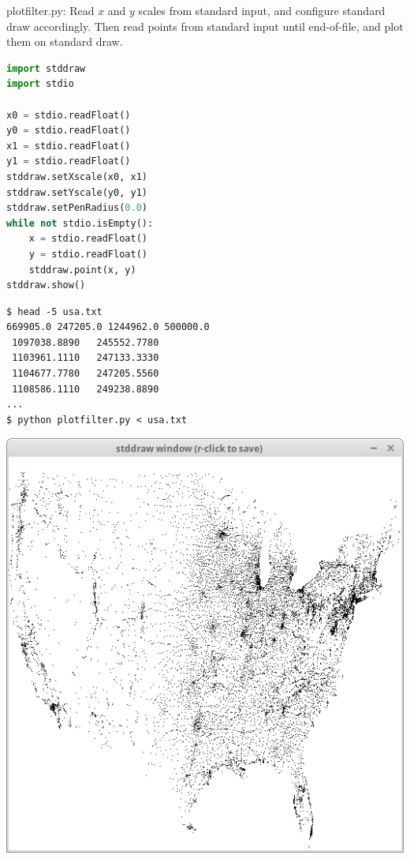 \documentclass[8pt,a4paper,compress,handout]{beamer}
\begin{document}
\begin{frame}[fragile]
\begin{framed}
\tiny plotfilter.py: Read $x$ and $y$ scales from standard input, and configure standard draw accordingly. Then read points from standard input until end-of-file, and plot them on standard draw.
\end{framed}

\begin{lstlisting}[language=Python]
import stddraw
import stdio

x0 = stdio.readFloat()
y0 = stdio.readFloat()
x1 = stdio.readFloat()
y1 = stdio.readFloat()
stddraw.setXscale(x0, x1)
stddraw.setYscale(y0, y1)
stddraw.setPenRadius(0.0)
while not stdio.isEmpty():
    x = stdio.readFloat()
    y = stdio.readFloat()
    stddraw.point(x, y)
stddraw.show()
\end{lstlisting}

\begin{minipage}{150pt}
\begin{lstlisting}[language={}]
$ head -5 usa.txt 
669905.0 247205.0 1244962.0 500000.0
 1097038.8890   245552.7780
 1103961.1110   247133.3330
 1104677.7780   247205.5560
 1108586.1110   249238.8890
...
$ python plotfilter.py < usa.txt
\end{lstlisting}
\end{minipage}%
\begin{minipage}{150pt}
\hfill \includegraphics[scale=0.18]{figures/usa.png}
\end{minipage}
\end{frame}
\end{document}
